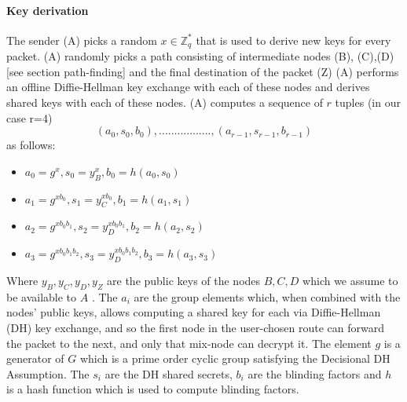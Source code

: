 \paragraph{Key derivation}
The sender (A) picks a random $x\in \mathbb{Z}^*_q$ that is used to derive new keys for every packet. 
\newline (A) randomly picks a path consisting of intermediate nodes (B), (C),(D) [see section path-finding] and the final destination of the packet (Z) 
\newline (A) performs an offline Diffie-Hellman key exchange with each of these nodes and derives shared keys with each of these nodes.
\newline (A) computes a sequence of $r$ tuples (in our case r=4)  $$(a_0,s_0,b_0),.................,(a_{r-1},s_{r-1},b_{r-1})$$ as follows:
\begin{itemize}
\item $a_0=g^x,s_0=y^x_B,b_0=h(a_0,s_0)$
\item $a_1=g^{xb_0},s_1=y^{xb_0}_C,b_1=h(a_1,s_1)$
\item $a_2=g^{xb_0b_1},s_2=y^{xb_0b_1}_D,b_2=h(a_2,s_2)$
\item $a_3=g^{xb_0b_1b_2},s_3=y^{xb_0b_1b_2}_D,b_3=h(a_3,s_3)$
\end{itemize}
 Where $y_B,y_C,y_D,y_Z$ are the public keys of the nodes $B,C, D$  which we assume to be available to $A$ . The $a_i$ are the group elements which, when combined with the nodes’ public keys, allows computing a shared key for each via Diffie-Hellman (DH) key exchange, 
 and so the first node in the user-chosen route can forward the packet to the next, and only that mix-node can decrypt it.
The element $g$ is a generator of $G$ which is a prime order cyclic group satisfying the Decisional DH Assumption. The $s_i$ are the DH shared secrets, $b_i$ are the blinding factors and $h$ is a hash function which is used to compute blinding factors.



